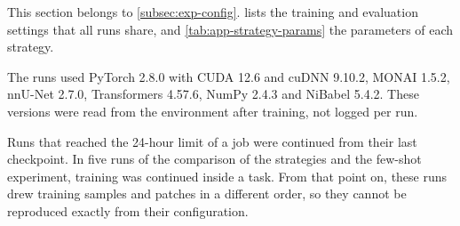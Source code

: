 This section belongs to \cref{subsec:exp-config}.
 lists the training and evaluation settings that all runs share, and \cref{tab:app-strategy-params} the parameters of each strategy.

The runs used PyTorch 2.8.0 with CUDA 12.6 and cuDNN 9.10.2, MONAI 1.5.2, nnU-Net 2.7.0, Transformers 4.57.6, NumPy 2.4.3 and NiBabel 5.4.2.
These versions were read from the environment after training, not logged per run.

Runs that reached the 24-hour limit of a job were continued from their last checkpoint.
In five runs of the comparison of the strategies and the few-shot experiment, training was continued inside a task.
From that point on, these runs drew training samples and patches in a different order, so they cannot be reproduced exactly from their configuration.

\begin{table}[tb]
\centering
\caption[Training and evaluation settings shared by all runs]{Training and evaluation settings shared by all runs (\cref{sec:method-setting-protocol,sec:method-adaptation}).}
\label{tab:app-hparams}

\end{table}

\begin{table}[tbp]
\centering
\caption[Parameters of the strategies]{Parameters of the strategies (\cref{sec:method-strategies}). Sequential fine-tuning has no parameters of its own. Bold: rank used in the comparison of the strategies. The scaling factor $\gamma_r = \alpha/\sqrt{r}$ is listed in the order of the ranks. The ensemble interval applies only to the weight ensemble, which is reported as an additional evaluation (\cref{sec:app-additional}). The prompt-tuning strategy without gradient scaling uses the same parameters with $\xi_{\mathcal{S},t} = 1$.}
\label{tab:app-strategy-params}

\end{table}

